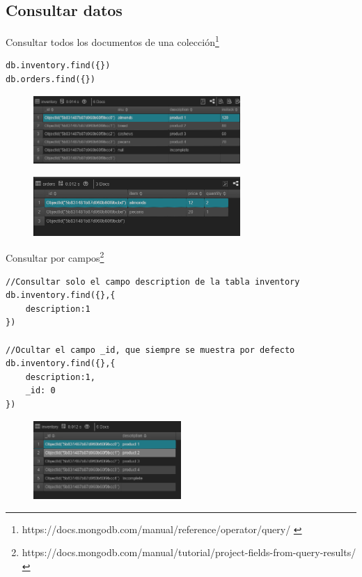 \documentclass[a4paper,11pt]{paper}
\begin{document}
\newpage
\hypertarget{consultar-datos}{%
\subsection{Consultar datos}\label{consultar-datos}}

Consultar todos los documentos de una colección\footnote{https://docs.mongodb.com/manual/reference/operator/query/ \cite{doc}}

\begin{verbatim}
db.inventory.find({})
db.orders.find({})
\end{verbatim}

\begin{figure}[!h]
\centering
\includegraphics[width=0.7\textwidth]{imgs/ConsultarInventory.png}
\end{figure}

\begin{figure}[!h]
\centering
\includegraphics[width=0.7\textwidth]{imgs/ConsultarOrders.png}
\end{figure}

Consultar por campos\footnote{https://docs.mongodb.com/manual/tutorial/project-fields-from-query-results/ \cite{doc}}

\begin{verbatim}
//Consultar solo el campo description de la tabla inventory
db.inventory.find({},{
    description:1
})

//Ocultar el campo _id, que siempre se muestra por defecto
db.inventory.find({},{
    description:1,
    _id: 0
})
\end{verbatim}

\begin{figure}[!h]
\centering
\includegraphics[width=0.5\textwidth]{imgs/FiltroDescripcion1.png}
\end{figure}
\end{document}
